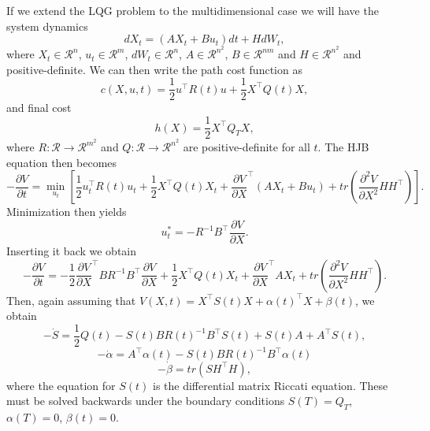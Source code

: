 If we extend the LQG problem to the multidimensional case we will have the system dynamics
$$
dX_t = (A X_t + B u_t) dt + H dW_t,
$$
where $X_t \in \mathcal{R}^n$, $u_t \in \mathcal{R}^m$, $dW_t \in \mathcal{R}^n$, $A \in \mathcal{R}^{n^2}$, $B \in \mathcal{R}^{nm}$ and $H\in \mathcal{R}^{n^2}$ and positive-definite. We can then write the path cost function as
$$
c(X,u,t) = \frac{1}{2} u^\top R(t) u + \frac{1}{2} X^\top Q(t) X,
$$
and final cost
$$
h(X) = \frac{1}{2} X^\top Q_T X,
$$
where $R: \mathcal{R} \to \mathcal{R}^{m^2}$ and $Q : \mathcal{R}\to \mathcal{R}^{n^2}$ are positive-definite for all $t$.
The HJB equation then becomes
$$
-\frac{\partial V}{\partial t} = \min_{u_t} \left[\frac{1}{2} u_t^\top R(t) u_t + \frac{1}{2} X^\top Q(t) X_t + \frac{\partial V}{\partial X}^\top \left(AX_t  + Bu_t\right) + tr\left(\frac{\partial^2 V}{\partial X^2} H H^\top\right)\right].
$$
Minimization then yields
$$
u^*_t = - R^{-1} B^\top \frac{\partial V}{\partial X}.
$$
Inserting it back we obtain
$$
-\frac{\partial V}{\partial t} =-\frac{1}{2} \frac{\partial V}{\partial X}^\top B R^{-1} B^\top \frac{\partial V}{\partial X}+ \frac{1}{2} X^\top Q(t) X_t + \frac{\partial V}{\partial X}^\top AX_t +  tr\left(\frac{\partial^2 V}{\partial X^2} H H^\top\right).
$$
Then, again assuming that $V(X,t) = X^\top S(t) X + \alpha(t)^\top X + \beta(t)$, we obtain
$$
-\dot{S} = \frac{1}{2} Q(t) - S(t) B R(t)^{-1} B^\top S(t) + S(t) A + A^\top S(t),
$$
$$
-\dot{\alpha} = A^\top \alpha(t) - S(t) BR(t)^{-1} B^\top \alpha(t)
$$
$$
-\dot{\beta} =  tr\left(S H^\top H\right),
$$
where the equation for $S(t)$ is the differential matrix Riccati equation. These must be solved backwards under the boundary conditions $S(T) = Q_T$, $\alpha(T)=0$, $\beta(t) = 0$.